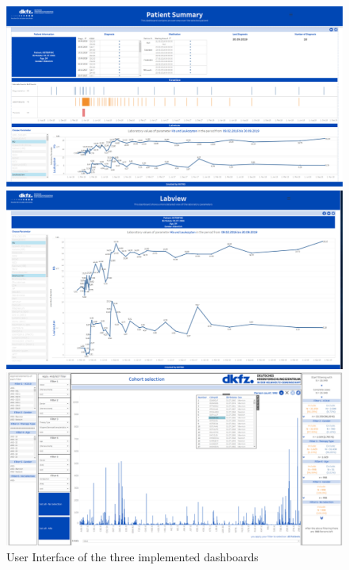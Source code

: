 \documentclass[aac,crcready]{iosart2x}
\begin{document}
\begin{figure}[ht]
   \begin{minipage}[b]{.5\linewidth}          \includegraphics[width=1.05\textwidth]{images/Pat sum.png}
   \end{minipage}%
   \hfill
   \begin{minipage}[b]{.5\linewidth} 
 \includegraphics[width=1.05\textwidth]{images/Labview.png} 
   \end{minipage}%
   \vfill
      \begin{minipage}[b]{\linewidth}          \includegraphics[width=1.05\textwidth]{images/ch sel.png}
   \end{minipage}%
   \caption{User Interface of the three implemented dashboards}\label{fig:overviewdashboard} 
\end{figure} 
\end{document}
